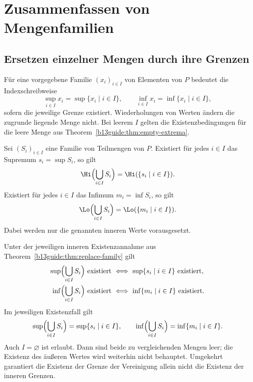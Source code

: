 \chapter{Zusammenfassen von Mengenfamilien}
\label{b13guide:ch:families}

\section{Ersetzen einzelner Mengen durch ihre Grenzen}


\begin{definition}
\label{b13guide:def:indexed}
Für eine vorgegebene Familie $(x_i)_{i\in I}$ von Elementen von $P$
bedeutet die Indexschreibweise
\[
 \sup_{i\in I}x_i=\sup\{x_i\mid i\in I\},\qquad
 \inf_{i\in I}x_i=\inf\{x_i\mid i\in I\},
\]
sofern die jeweilige Grenze existiert. Wiederholungen von Werten
ändern die zugrunde liegende Menge nicht. Bei leerem $I$ gelten
die Existenzbedingungen für die leere Menge aus
Theorem~\ref{b13guide:thm:empty-extrema}.
\end{definition}

\begin{theorem}
\label{b13guide:thm:replace-family}
Sei $(S_i)_{i\in I}$ eine Familie von Teilmengen von $P$.
Existiert für jedes $i\in I$ das Supremum $s_i=\sup S_i$, so gilt
\[
 \Hi\Bigl(\bigcup_{i\in I}S_i\Bigr)
       =\Hi(\{s_i\mid i\in I\}).
\]
Existiert für jedes $i\in I$ das Infimum $m_i=\inf S_i$, so gilt
\[
 \Lo\Bigl(\bigcup_{i\in I}S_i\Bigr)
       =\Lo(\{m_i\mid i\in I\}).
\]
Dabei werden nur die genannten inneren Werte vorausgesetzt.
\end{theorem}

\begin{theorem}
\label{b13guide:thm:flatten}
Unter der jeweiligen inneren Existenzannahme aus
Theorem~\ref{b13guide:thm:replace-family} gilt
\[
\begin{aligned}
 \sup\Bigl(\bigcup_{i\in I}S_i\Bigr)\text{ existiert}
   &\ \Longleftrightarrow\ \sup\{s_i\mid i\in I\}\text{ existiert},\\
 \inf\Bigl(\bigcup_{i\in I}S_i\Bigr)\text{ existiert}
   &\ \Longleftrightarrow\ \inf\{m_i\mid i\in I\}\text{ existiert}.
\end{aligned}
\]
Im jeweiligen Existenzfall gilt
\[
 \sup\Bigl(\bigcup_{i\in I}S_i\Bigr)=\sup\{s_i\mid i\in I\},\qquad
 \inf\Bigl(\bigcup_{i\in I}S_i\Bigr)=\inf\{m_i\mid i\in I\}.
\]
Auch $I=\varnothing$ ist erlaubt. Dann sind beide zu vergleichenden
Mengen leer; die Existenz des äußeren Wertes wird weiterhin nicht
behauptet. Umgekehrt garantiert die Existenz der Grenze der
Vereinigung allein nicht die Existenz der inneren Grenzen.
\end{theorem}



